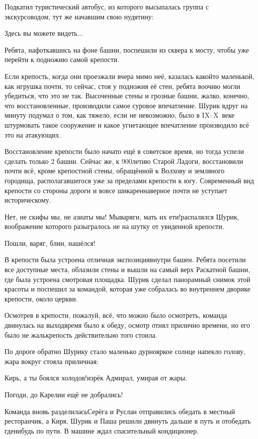 Подкатил туристический автобус, из которого высыпалась группа с экскурсоводом, тут же начавшим свою нудятину:

\diagdash Здесь вы можете видеть$\ldots$

Ребята, нафоткавшись на фоне башни, поспешили из сквера к мосту, чтобы уже перейти к подножию самой крепости.

Если крепость, когда они проезжали вчера мимо неё, казалась какой\sdash то маленькой, как игрушка почти, то сейчас, стоя у подножия её стен, ребята воочию могли убедиться, что это не так. Высоченные стены и грозные башни, жалко, конечно, что восстановленные, производили самое суровое впечатление. Шурик вдруг на минуту подумал о том, как тяжело, если не невозможно, было в IX--X~веке штурмовать такое сооружение и какое угнетающее впечатление производило всё это на атакующих.

Восстановление крепости было начато ещё в советское время, но тогда успели сделать только 2 башни. Сейчас же, к 900\sdash летию Старой Ладоги, восстановили почти всё, кроме крепостной стены, обращённой к Волхову и земляного городища, располагавшегося уже за пределами крепости к югу. Современный вид крепости со стороны дороги и вовсе шикарен\mdash наверное почти не уступает историческому. 

\diagdash Нет, не скифы мы, не азиаты мы! Мы\mdash варяги, мать их ети!\mdash распалялся Шурик, воображение которого разыгралось не на шутку от увиденной крепости.

\diagdash Пошли, варяг, блин, нашёлся!

В крепости была устроена отличная экспозиция\mdash внутри башен. Ребята посетили все доступные места, облазили стены и вышли на самый верх Раскатной башни, где была устроена смотровая площадка. Шурик сделал панорамный снимок этой красоты и поспешил за командой, которая уже собралась во внутреннем дворике крепости, около церкви.

Осмотрев в крепости, пожалуй, всё, что можно было осмотреть, команда двинулась на выход\mdash время было к обеду, осмотр отнял прилично времени, но его было не жаль\mdash крепость действительно того стоила. 

По дороге обратно Шурику стало маленько дурно\mdash яркое солнце напекло голову, жара вокруг стояла приличная:

\diagdash Кирь, а ты боялся холодов!\mdash изрёк Адмирал, умирая от жары.

\diagdash Погоди, до Карелии ещё не добрались!

Команда вновь разделилась\mdash Серёга и Руслан отправились обедать в местный ресторанчик, а Киря, Шурик и Паша решили двинуть дальше в путь и отобедать где\sdash нибудь по пути. В машине ждал спасительный кондиционер.

